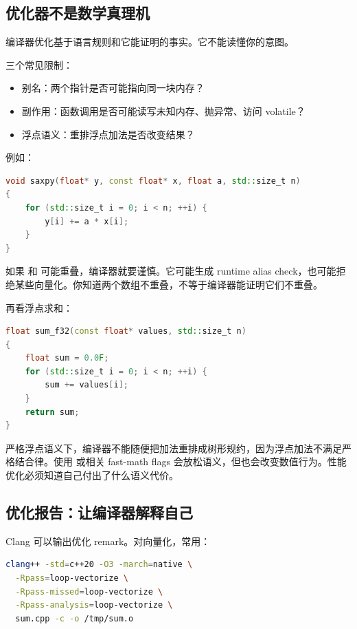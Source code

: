 \subsection{优化器不是数学真理机}

编译器优化基于语言规则和它能证明的事实。它不能读懂你的意图。

三个常见限制：

\begin{itemize}
  \item 别名：两个指针是否可能指向同一块内存？
  \item 副作用：函数调用是否可能读写未知内存、抛异常、访问 volatile？
  \item 浮点语义：重排浮点加法是否改变结果？
\end{itemize}

例如：

\begin{lstlisting}[language=C++]
void saxpy(float* y, const float* x, float a, std::size_t n)
{
    for (std::size_t i = 0; i < n; ++i) {
        y[i] += a * x[i];
    }
}
\end{lstlisting}

如果  和  可能重叠，编译器就要谨慎。它可能生成 runtime alias check，也可能拒绝某些向量化。你知道两个数组不重叠，不等于编译器能证明它们不重叠。

再看浮点求和：

\begin{lstlisting}[language=C++]
float sum_f32(const float* values, std::size_t n)
{
    float sum = 0.0F;
    for (std::size_t i = 0; i < n; ++i) {
        sum += values[i];
    }
    return sum;
}
\end{lstlisting}

严格浮点语义下，编译器不能随便把加法重排成树形规约，因为浮点加法不满足严格结合律。使用  或相关 fast-math flags 会放松语义，但也会改变数值行为。性能优化必须知道自己付出了什么语义代价。

\subsection{优化报告：让编译器解释自己}

Clang 可以输出优化 remark。对向量化，常用：

\begin{lstlisting}[language=bash]
clang++ -std=c++20 -O3 -march=native \
  -Rpass=loop-vectorize \
  -Rpass-missed=loop-vectorize \
  -Rpass-analysis=loop-vectorize \
  sum.cpp -c -o /tmp/sum.o
\end{lstlisting}

